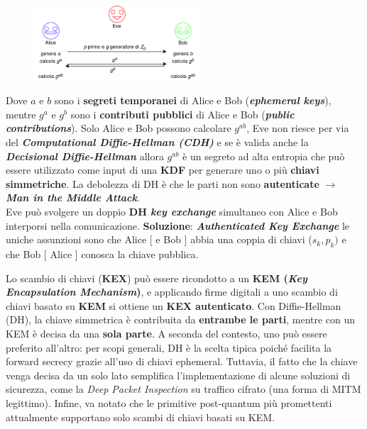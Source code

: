 \begin{flushleft}
    \begin{figure}[h]
        \centering
        \includegraphics[width=0.55\textwidth]{img/dh.png}
    \end{figure}
    Dove $a$ e $b$ sono i \textbf{segreti temporanei} di Alice e Bob (\textbf{\textit{ephemeral keys}}), mentre $g^a$ e $g^b$ sono i \textbf{contributi pubblici} di Alice e Bob (\textbf{\textit{public contributions}}). Solo Alice e Bob possono calcolare $g^{ab}$, Eve non riesce per via del \textbf{\textit{Computational Diffie-Hellman (CDH)}} e se è valida anche la \textbf{\textit{Decisional Diffie-Hellman}} allora $g^{ab}$ è un segreto ad alta entropia che può essere utilizzato come input di una \textbf{KDF} per generare uno o più \textbf{chiavi simmetriche}. La debolezza di DH è che le parti non sono \textbf{autenticate} $\rightarrow$ \textbf{\textit{Man in the Middle Attack}}. \\
    Eve può svolgere un doppio \textbf{DH \textit{key exchange}} simultaneo con Alice e Bob interporsi nella comunicazione. \textbf{Soluzione}: \textbf{\textit{Authenticated Key Exchange}} le uniche assunzioni sono che Alice [ e Bob ] abbia una coppia di chiavi ($s_k, p_k)$ e che Bob [ Alice ] conosca la chiave pubblica.

    \smallskip

    Lo scambio di chiavi (\textbf{KEX}) può essere ricondotto a un \textbf{KEM (\textit{Key Encapsulation Mechanism})}, e applicando firme digitali a uno scambio di chiavi basato su \textbf{KEM} si ottiene un \textbf{KEX autenticato}. Con Diffie-Hellman (DH), la chiave simmetrica è contribuita da \textbf{entrambe le parti}, mentre con un KEM è decisa da una \textbf{sola parte}. A seconda del contesto, uno può essere preferito all'altro: per scopi generali, DH è la scelta tipica poiché facilita la forward secrecy grazie all'uso di chiavi ephemeral. Tuttavia, il fatto che la chiave venga decisa da un solo lato semplifica l'implementazione di alcune soluzioni di sicurezza, come la \textit{Deep Packet Inspection} su traffico cifrato (una forma di MITM legittimo). Infine, va notato che le primitive post-quantum più promettenti attualmente supportano solo scambi di chiavi basati su KEM.

\end{flushleft}

